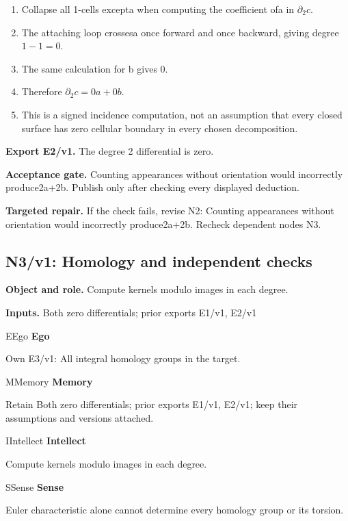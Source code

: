\documentclass[preprint,12pt,aps,pra,showkeys,amsmath,amssymb,superscriptaddress,floatfix]{revtex4-2}
\theoremstyle{definition}
\theoremstyle{remark}
\newcommand{\mmfaculty}[3]{%
 \begin{mmfacultybox}{#1}{#2}
 {\sffamily\bfseries\color{MMBlue}#2}\par\smallskip #3
 \end{mmfacultybox}}
\newcommand{\field}[2]{\par\smallskip\noindent\textbf{#1.} #2\par}
\begin{document}
\begin{enumerate}[label=N2.\arabic*,leftmargin=3.4em]

\item Collapse all 1-cells excepta when computing the coefficient ofa in
\(\partial _{2}c\).

\item The attaching loop crossesa once forward and once backward, giving
degree \(1-1=0\).

\item The same calculation for b gives 0.

\item Therefore \(\partial _{2}c=0a+0b\).

\item This is a signed incidence computation, not an assumption that every
closed surface has zero cellular boundary in every chosen decomposition.

\end{enumerate}

\field{Export E2/v1}{The degree 2 differential is zero.}

\field{Acceptance gate}{Counting appearances without orientation would incorrectly produce2a+2b.
Publish only after checking every displayed deduction.}

\field{Targeted repair}{If the check fails, revise N2: Counting appearances without orientation
would incorrectly produce2a+2b. Recheck dependent nodes N3.}

\clearpage

\subsection{N3/v1: Homology and independent checks}

\field{Object and role}{Compute kernels modulo images in each degree.}

\field{Inputs}{Both zero differentials; prior exports E1/v1, E2/v1}

\mmfaculty{E}{Ego}{Own E3/v1: All integral homology groups in the target.}

\mmfaculty{M}{Memory}{Retain Both zero differentials; prior exports E1/v1, E2/v1; keep their
assumptions and versions attached.}

\mmfaculty{I}{Intellect}{Compute kernels modulo images in each degree.}

\mmfaculty{S}{Sense}{Euler characteristic alone cannot determine every homology group or its
torsion.}
\end{document}
